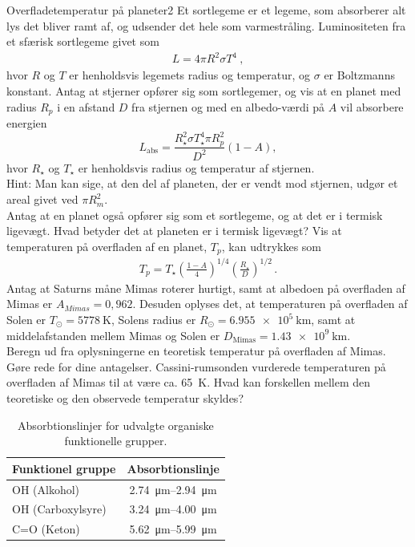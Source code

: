 %
%
\begin{opgave}{Overfladetemperatur på planeter}{2}
Et sortlegeme er et legeme, som absorberer alt lys det bliver ramt af, og udsender det hele som varmestråling. Luminositeten fra et sfærisk sortlegeme givet som
\begin{align*}
    L = 4\pi R^2 \sigma T^4 \: ,
\end{align*}
hvor $R$ og $T$ er henholdsvis legemets radius og temperatur, og $\sigma$ er Boltzmanns konstant.
\opg Antag at stjerner opfører sig som sortlegemer, og vis at en planet med  radius $R_p$ i en afstand $D$ fra stjernen og med en albedo-værdi på $A$ vil absorbere energien
\begin{equation}
    L_\text{abs} = \frac{R_\star^2\sigma T_\star^4 \pi R_p^2}{D^2} \left(1 - A \right),
\end{equation}
hvor $R_\star$ og $T_\star$ er henholdsvis radius og temperatur af stjernen. \\
Hint: Man kan sige, at den del af planeten, der er vendt mod stjernen, udgør et areal givet ved $\pi R_m^2$. \\[2mm]
Antag at en planet også opfører sig som et sortlegeme, og at det er i termisk ligevægt.
\opg Hvad betyder det at planeten er i termisk ligevægt?
\opg Vis at temperaturen på overfladen af en planet, $T_p$, kan udtrykkes som
\begin{align*}
	T_p = T_\star \left( \frac{1-A}{4} \right)^{1/4} \left(\frac{R_\star}{D} \right)^{1/2} \, .
\end{align*}
\opg Antag at Saturns måne Mimas roterer hurtigt, samt at albedoen på overfladen af Mimas er $A_{Mimas} = 0,962$. Desuden oplyses det, at temperaturen på overfladen af Solen er $T_\odot = \SI{5778}{\kelvin}$, Solens radius er $R_\odot = \SI{6,955e5}{\kilo\metre}$, samt at middelafstanden mellem Mimas og Solen er $D_{\text{Mimas}} = \SI{1,43e9}{\kilo\metre}$. \\
Beregn ud fra oplysningerne en teoretisk temperatur på overfladen af Mimas. Gøre rede for dine antagelser. Cassini-rumsonden vurderede temperaturen på overfladen af Mimas til at være ca. \SI{65}{\kelvin}. Hvad kan forskellen mellem den teoretiske og den observede temperatur skyldes?
\end{opgave}
%
%
\def\arraystretch{1.3}
%
\begin{table}[h!]
    \centering
    \begin{tabular}{l|c}
        \textbf{Funktionel gruppe} & \textbf{Absorbtionslinje} \\ \hline
        OH (Alkohol) & \SIrange{2.74}{2.94}{\micro\metre} \\
        OH (Carboxylsyre) & \SIrange{3.24}{4,00}{\micro\metre} \\
        C=O (Keton) & \SIrange{5.62}{5.99}{\micro\metre} \\
    \end{tabular}
    \caption{Absorbtionslinjer for udvalgte organiske funktionelle grupper.}
    \label{tab:IR_linjer}
\end{table}
